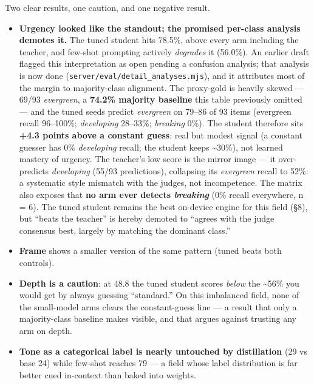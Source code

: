 \documentclass[11pt]{article}
\providecommand{\tightlist}{\setlength{\itemsep}{0pt}\setlength{\parskip}{0pt}}
\providecommand{\tightlist}{%
  \setlength{\itemsep}{0pt}\setlength{\parskip}{0pt}}
\begin{document}
Two clear results, one caution, and one negative result.

\begin{itemize}
\tightlist
\item
  \textbf{Urgency looked like the standout; the promised per-class
  analysis demotes it.} The tuned student hits 78.5\%, above every arm
  including the teacher, and few-shot prompting actively \emph{degrades}
  it (56.0\%). An earlier draft flagged this interpretation as open
  pending a confusion analysis; that analysis is now done
  (\texttt{server/eval/detail\_analyses.mjs}), and it attributes most of
  the margin to majority-class alignment. The proxy-gold is heavily
  skewed --- 69/93 \emph{evergreen}, a \textbf{74.2\% majority baseline}
  this table previously omitted --- and the tuned seeds predict
  \emph{evergreen} on 79--86 of 93 items (evergreen recall 96--100\%;
  \emph{developing} 28--33\%; \emph{breaking} 0\%). The student
  therefore sits \textbf{+4.3 points above a constant guess}: real but
  modest signal (a constant guesser has 0\% \emph{developing} recall;
  the student keeps \textasciitilde30\%), not learned mastery of
  urgency. The teacher's low score is the mirror image --- it
  over-predicts \emph{developing} (55/93 predictions), collapsing its
  \emph{evergreen} recall to 52\%: a systematic style mismatch with the
  judges, not incompetence. The matrix also exposes that \textbf{no arm
  ever detects \emph{breaking}} (0\% recall everywhere, n = 6). The
  tuned student remains the best on-device engine for this field (§8),
  but ``beats the teacher'' is hereby demoted to ``agrees with the judge
  consensus best, largely by matching the dominant class.''
\item
  \textbf{Frame} shows a smaller version of the same pattern (tuned
  beats both controls).
\item
  \textbf{Depth is a caution}: at 48.8 the tuned student scores
  \emph{below} the \textasciitilde56\% you would get by always guessing
  ``standard.'' On this imbalanced field, none of the small-model arms
  clears the constant-guess line --- a result that only a majority-class
  baseline makes visible, and that argues against trusting any arm on
  depth.
\item
  \textbf{Tone as a categorical label is nearly untouched by
  distillation} (29 vs base 24) while few-shot reaches 79 --- a field
  whose label distribution is far better cued in-context than baked into
  weights.
\end{itemize}
\end{document}
